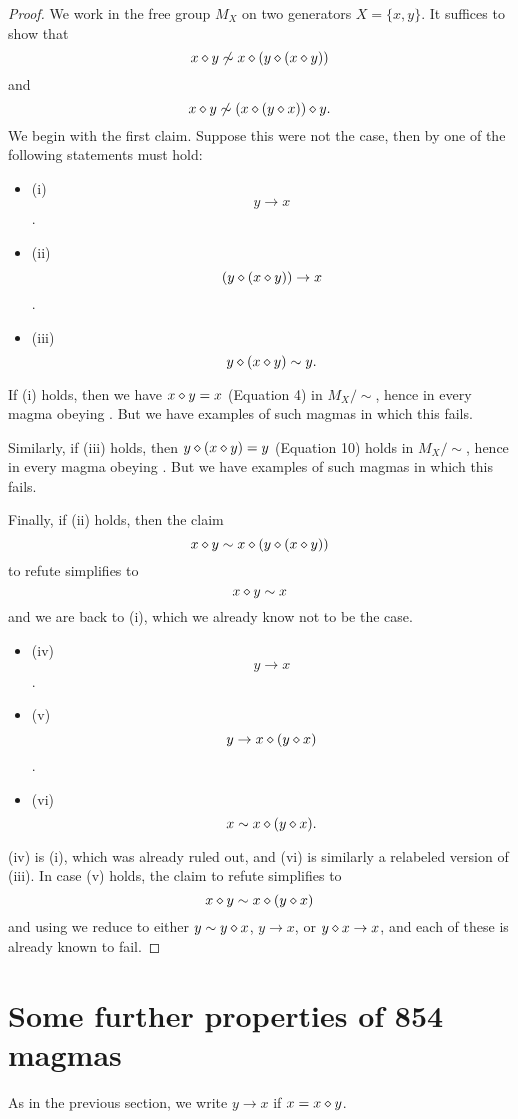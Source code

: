 \begin{proof}
  We work in the free group $M_X$ on two generators $X = \{x,y\}$.  It suffices to show that
$$  x \diamond y \not \sim x \diamond (y \diamond (x \diamond y))$$
and
$$
x \diamond y \not \sim (x \diamond (y \diamond x)) \diamond y.$$
We begin with the first claim.  Suppose this were not the case, then by  one of the following statements must hold:
\begin{itemize}
\item (i) $$y \to x$$.
\item (ii) $$(y \diamond (x \diamond y)) \to x$$.
\item (iii) $$y \diamond (x \diamond y) \sim y.$$
\end{itemize}
If (i) holds, then we have $x \diamond y = x$ (Equation 4) in $M_X/\sim$, hence in every magma obeying .  But we have examples of such magmas in which this fails.

Similarly, if (iii) holds, then $y \diamond (x \diamond y) = y$ (Equation 10) holds in $M_X/\sim$, hence in every magma obeying .  But we have examples of such magmas in which this fails.

Finally, if (ii) holds, then the claim
$$  x \diamond y \sim x \diamond (y \diamond (x \diamond y))$$
to refute simplifies to
$$  x \diamond y \sim x$$
and we are back to (i), which we already know not to be the case.
\begin{itemize}
  \item (iv) $$y \to x$$.
  \item (v) $$y \to x \diamond (y \diamond x)$$.
  \item (vi) $$x \sim x \diamond (y \diamond x).$$
  \end{itemize}
(iv) is (i), which was already ruled out, and (vi) is similarly a relabeled version of (iii). In case (v) holds, the claim to refute simplifies to
$$
x \diamond y \sim x \diamond (y \diamond x)$$
and using  we reduce to either $y \sim y \diamond x$, $y \to x$, or $y \diamond x \to x$, and each of these is already known to fail.
\end{proof}

\section{Some further properties of 854 magmas}

As in the previous section, we write $y \to x$ if $x = x \diamond y$.

